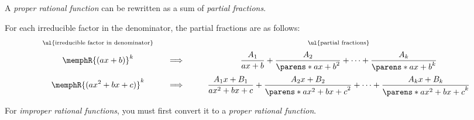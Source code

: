 \begin{CheatsheetEntryFrame}


    A \textit{proper rational function} can be rewritten as a sum of \textit{partial fractions}.

    For each irreducible factor in the denominator, the partial fractions are as follows:
    \renewcommand{\W}{\displaystyle}
    \begin{equation*}
        \begin{array}{ccccc}
            \substack{\text{\ul{irreducible factor in denominator}}} &&&&
                \substack{\text{\ul{partial fractions}}}
                \\[1ex]
            \W \memphR{(ax + b)}^k &
                & \Longrightarrow & \quad &
                \W \frac{A_1}{ax + b} + \frac{A_2}{\parens*{ax + b}^2} + \dots + \frac{A_k}{\parens*{ax + b}^k}
                \\[3ex]
            \W \memphR{(ax^2 + bx + c)}^k &
                & \Longrightarrow & \quad &
                \W \frac{A_1 x + B_1}{ax^2 + bx + c} + \frac{A_2 x + B_2}{\parens*{ax^2 + bx + c}^2} + \dots + \frac{A_k x + B_k}{\parens*{ax^2 + bx + c}^k}
                \\
        \end{array}
    \end{equation*}

    For \textit{improper rational functions}, you must first convert it to a \textit{proper rational function}.

\end{CheatsheetEntryFrame}

\begin{multicols}{2}

    \begin{CheatsheetEntryFrame}


    \end{CheatsheetEntryFrame}

    \MulticolsBreak

    \MulticolsPhantomPlaceholder

\end{multicols}


